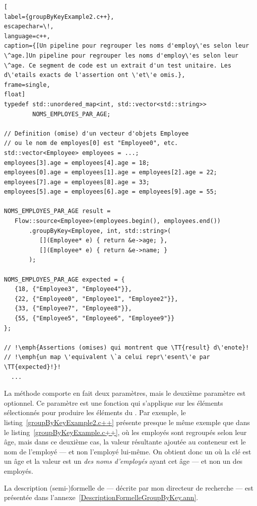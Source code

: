 \begin{lstlisting}[
label={groupByKeyExample2.c++},
escapechar=\!,
language=c++,
caption={[Un pipeline pour regrouper les noms d'employ\'es selon leur \^age.]Un pipeline pour regrouper les noms d'employ\'es selon leur \^age. Ce segment de code est un extrait d'un test unitaire. Les d\'etails exacts de l'assertion ont \'et\'e omis.},
frame=single,
float]
typedef std::unordered_map<int, std::vector<std::string>> 
        NOMS_EMPLOYES_PAR_AGE;

// Definition (omise) d'un vecteur d'objets Employee 
// ou le nom de employes[0] est "Employee0", etc.
std::vector<Employee> employees = ...; 
employees[3].age = employees[4].age = 18;
employees[0].age = employees[1].age = employees[2].age = 22;
employees[7].age = employees[8].age = 33;
employees[5].age = employees[6].age = employees[9].age = 55;

NOMS_EMPLOYES_PAR_AGE result = 
   Flow::source<Employee>(employees.begin(), employees.end())
       .groupByKey<Employee, int, std::string>(
          [](Employee* e) { return &e->age; },
          [](Employee* e) { return &e->name; }
       );
    
NOMS_EMPLOYES_PAR_AGE expected = {
   {18, {"Employee3", "Employee4"}},
   {22, {"Employee0", "Employee1", "Employee2"}},
   {33, {"Employee7", "Employee8"}},
   {55, {"Employee5", "Employee6", "Employee9"}}
};

// !\emph{Assertions (omises) qui montrent que \TT{result} d\'enote}!
// !\emph{un map \'equivalent \`a celui repr\'esent\'e par \TT{expected}!}!
  ...
\end{lstlisting}


La m\'ethode  comporte en fait deux param\`etres, mais le deuxi\`eme param\`etre est optionnel. Ce param\`etre est une fonction qui s'applique sur les \'el\'ements s\'electionn\'es pour produire les \'el\'ements du . Par exemple,  le listing~\ref{groupByKeyExample2.c++} pr\'esente presque le m\^eme exemple que dans le listing~\ref{groupByKeyExample.c++}, o\`u les employ\'es sont regroup\'es selon leur \^age, mais dans ce deuxi\`eme cas, la valeur r\'esultante ajout\'ee au conteneur est le nom de l'employ\'e --- et non l'employ\'e lui-m\^eme. On obtient donc un  o\`u la cl\'e est un \^age et la valeur est un  \emph{des noms d'employ\'es} ayant cet \^age --- et non un  des employ\'es.


La description (semi-)formelle de  --- d\'ecrite par mon directeur de recherche --- est pr\'esent\'ee dans l'annexe~\ref{DescriptionFormelleGroupByKey.ann}.




